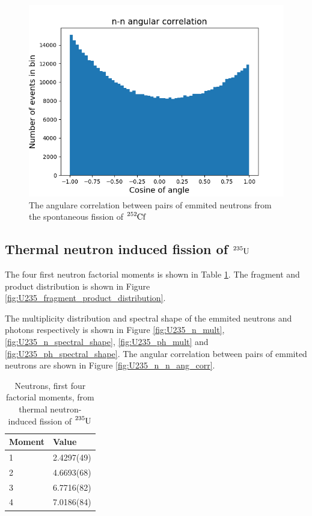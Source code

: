 \documentclass[]{article}
\begin{document}
\begin{figure} [H]
	\centering
	\includegraphics[scale=0.7]{Cf252_sf_n_n_ang_corr.png}
	\caption{The angulare correlation between pairs of emmited neutrons from the spontaneous fission of $\ce{^{252}Cf}$}
	\label{fig:Cf252_sf_n_n_ang_corr}
\end{figure}
	
\subsection{Thermal neutron induced fission of $\ce{^{235}U}$}

The four first neutron factorial moments is shown in Table \ref{tab:U235_n_moments}. The fragment and product distribution is shown in Figure \ref{fig:U235_fragment_product_distribution}. 

The multiplicity distribution and spectral shape of the emmited neutrons and photons respectively is shown in Figure \ref{fig:U235_n_mult}, \ref{fig:U235_n_spectral_shape}, \ref{fig:U235_ph_mult} and \ref{fig:U235_ph_spectral_shape}. The angular correlation between pairs of emmited neutrons are shown in Figure \ref{fig:U235_n_n_ang_corr}.

\begin{table} [H]
	\centering
	\caption{Neutrons, first four factorial moments, from thermal neutron-induced fission of $\ce{^{235}U}$ }
	\begin{tabularx}{\textwidth}{XX} \hline
		\label{tab:U235_n_moments}
		Moment & Value \\ \hline
		1 & 2.4297(49) \\
		2 & 4.6693(68)\\
		3 & 6.7716(82)\\
		4 & 7.0186(84)\\ 
	\end{tabularx}
\end{table}
\end{document}

